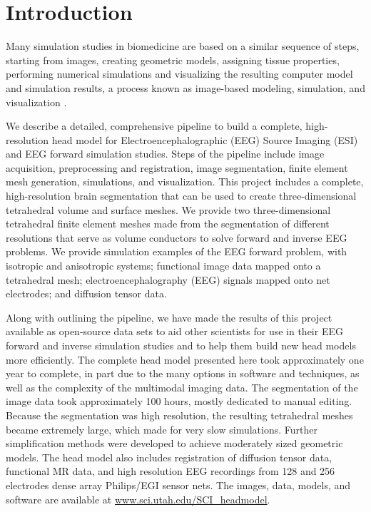 
\section{Introduction}
\label{sec:intro}

Many simulation studies in biomedicine are based on a similar sequence of steps, starting from images, creating geometric models, assigning tissue properties, performing numerical simulations and visualizing the resulting computer model and simulation results, a process known as image-based modeling, simulation, and visualization \cite{SCI:Mac2009a,SCI:Joh2015c,SCI:Joh2012a,SCI:Joh2006a,SCI:Joh2004b}.

We describe a detailed, comprehensive pipeline to build a complete, high-resolution head model for Electroencephalographic (EEG) Source Imaging (ESI) and EEG forward simulation studies.  Steps of the pipeline include image acquisition, preprocessing and registration, image segmentation, finite element mesh generation, simulations, and visualization. This project includes a complete, high-resolution brain segmentation that can be used to create three-dimensional tetrahedral volume and surface meshes. We provide two three-dimensional tetrahedral finite element meshes made from the segmentation of different resolutions that serve as volume conductors to solve forward and inverse EEG problems. We provide simulation examples of the EEG forward problem, with isotropic and anisotropic systems; functional image data mapped onto a tetrahedral mesh; electroencephalography (EEG) signals mapped onto net electrodes; and diffusion tensor data.

Along with outlining the pipeline, we have made the results of this project available as open-source data sets to aid other scientists for use in their EEG forward and inverse simulation studies and to help them build new head models more efficiently. The complete head model presented here took approximately one year to complete, in part due to the many options in software and techniques, as well as the complexity of the multimodal imaging data. The segmentation of the image data took approximately 100 hours, mostly dedicated to manual editing. Because the segmentation was high resolution, the resulting tetrahedral meshes became extremely large, which made for very slow simulations. Further simplification methods were developed to achieve moderately sized geometric models.  The head model also includes registration of diffusion tensor data, functional MR data, and high resolution EEG recordings from 128 and 256 electrodes dense array Philips/EGI sensor nets. The images, data, models, and software are
available at \url{www.sci.utah.edu/SCI_headmodel}.